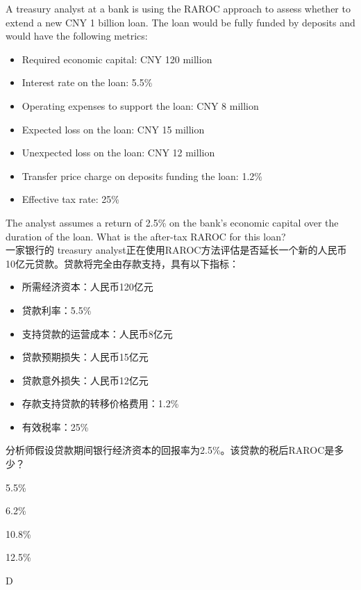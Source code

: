 \documentclass{article}
\newcounter{question} %
\begin{document}
\begin{question}
    A treasury analyst at a bank is using the RAROC approach to assess whether to extend a new CNY 1 billion loan. The loan would be fully funded by deposits and would have the following metrics:
    \begin{itemize}
        \item Required economic capital: CNY 120 million
        \item Interest rate on the loan: 5.5\%
        \item Operating expenses to support the loan: CNY 8 million
        \item Expected loss on the loan: CNY 15 million
        \item Unexpected loss on the loan: CNY 12 million
        \item Transfer price charge on deposits funding the loan: 1.2\%
        \item Effective tax rate: 25\%
    \end{itemize}
    The analyst assumes a return of 2.5\% on the bank's economic capital over the duration of the loan. What is the after-tax RAROC for this loan?
    \\一家银行的 treasury analyst正在使用RAROC方法评估是否延长一个新的人民币10亿元贷款。贷款将完全由存款支持，具有以下指标：
    \begin{itemize}
        \item 所需经济资本：人民币120亿元
        \item 贷款利率：5.5\%
        \item 支持贷款的运营成本：人民币8亿元
        \item 贷款预期损失：人民币15亿元
        \item 贷款意外损失：人民币12亿元
        \item 存款支持贷款的转移价格费用：1.2\%
        \item 有效税率：25\%
    \end{itemize}
    分析师假设贷款期间银行经济资本的回报率为2.5\%。该贷款的税后RAROC是多少？
\end{question}

\begin{choices}
    \item 5.5\%
    \item 6.2\%
    \item 10.8\%
    \item 12.5\%
\end{choices}

\begin{correctanswer}
    D
\end{correctanswer}
\end{document}

